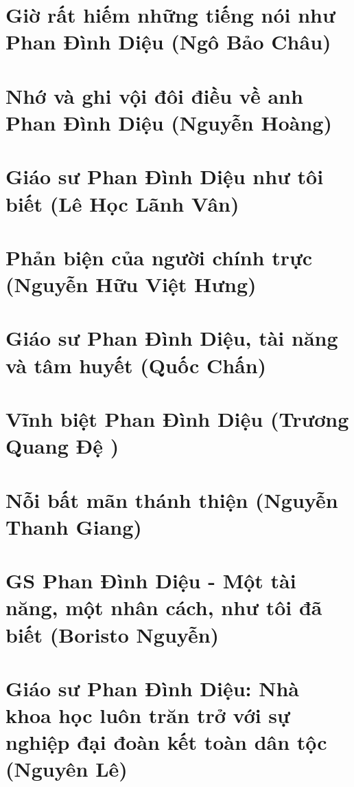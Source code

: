 \documentclass[11pt,twoside]{extreport}
\begin{document}
\chapter{Giờ rất hiếm những tiếng nói như Phan Đình Diệu (Ngô Bảo Châu)}



\chapter{Nhớ và ghi vội đôi điều về anh Phan Đình Diệu (Nguyễn Hoàng)}


\chapter{Giáo sư Phan Đình Diệu như tôi biết (Lê Học Lãnh Vân)}


\chapter{Phản biện của người chính trực (Nguyễn Hữu Việt Hưng)}


 
\chapter{Giáo sư Phan Đình Diệu, tài năng và tâm huyết (Quốc Chấn)}



\chapter{Vĩnh biệt Phan Đình Diệu (Trương Quang Đệ )}



\chapter{Nỗi bất mãn thánh thiện (Nguyễn Thanh Giang)}



\chapter{GS Phan Đình Diệu - Một tài năng, một nhân cách, như tôi đã biết  (Boristo Nguyễn)}




\chapter{Giáo sư Phan Đình Diệu: Nhà khoa học luôn trăn trở với sự nghiệp đại đoàn kết toàn dân tộc (Nguyên Lê)}

\end{document}

